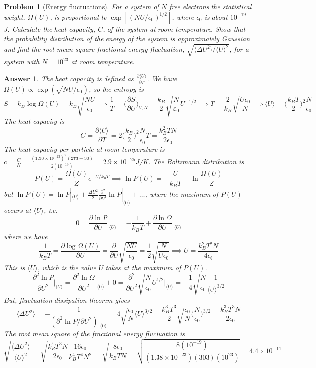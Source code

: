 \documentclass[a4paper]{article}
\theoremstyle{new2}
\newtheorem{ans}{Answer}[section]
\theoremstyle{new}
\newtheorem{qns}{Problem}[section]
\begin{document}
\begin{qns}[Energy fluctuations]
For a system of $N$ free electrons the statistical weight, $\Omega(U)$, is proportional to $\exp[(NU/\epsilon_0)^{1/2}]$, where $\epsilon_0$ is about $10^{−19}$ J. Calculate the heat capacity, $C$, of the system at room temperature. Show that the probability distribution of the energy of the system is approximately Gaussian and find the root mean square fractional energy fluctuation, $\sqrt{\langle\Delta U^2\rangle/\langle U\rangle^2}$, for a system with $N = 10^{23}$ at room temperature. 
\end{qns}
\begin{ans}
The heat capacity is defined as $\frac{\partial\langle U\rangle}{\partial T}$. We have $\Omega(U)\propto\exp(\sqrt{NU/\epsilon_0})$, so the entropy is
$$S=k_B\log\Omega(U)=k_B\sqrt{\frac{NU}{\epsilon_0}}\implies\frac{1}{T}=\bigg(\frac{\partial S}{\partial U}\bigg)_{V,N}=\frac{k_B}{2}\sqrt{\frac{N}{\varepsilon_0}}U^{-1/2}\implies T=\frac{2}{k_B}\sqrt{\frac{U\epsilon_0}{N}}\implies\langle U\rangle=\bigg(\frac{k_BT}{2}\bigg)^2\frac{N}{\epsilon_0}$$
The heat capacity is
$$C=\frac{\partial\langle U\rangle}{\partial T}=2\bigg(\frac{k_B}{2}\bigg)^2\frac{N}{\epsilon_0}T=\frac{k_B^2TN}{2\epsilon_0}$$
The heat capacity per particle at room temperature is $c=\frac{C}{N}=\frac{(1.38\times10^{-23})^2(273+30)}{2(10^{-19})}=2.9\times10^{-25}$J/K. The Boltzmann distribution is
$$P(U)=\frac{\Omega(U)}{Z}e^{-U/k_BT}\implies\ln P(U)=-\frac{U}{k_BT}+\ln\frac{\Omega(U)}{Z}$$
but $\ln P(U)=\ln P|_{\langle U\rangle}+\frac{\Delta U^2}{2}\frac{\partial^2}{\partial U^2}\ln P|_{\langle U\rangle}+\dots$, where the maximum of $P(U)$ occurs at $\langle U\rangle$, i.e. 
$$0=\frac{\partial\ln P}{\partial U}\bigg|_{\langle U\rangle}=-\frac{1}{k_BT}+\frac{\partial\ln\Omega}{\partial U}\bigg|_{\langle U\rangle}$$
where we have
$$\frac{1}{k_BT}=\frac{\partial\log\Omega(U)}{\partial U}=\frac{\partial}{\partial U}\sqrt{\frac{NU}{\epsilon_0}}=\frac{1}{2}\sqrt{\frac{N}{U\epsilon_0}}\implies U=\frac{k_B^2T^2N}{4\epsilon_0}$$
This is $\langle U\rangle$, which is the value $U$ takes at the maximum of $P(U)$.
$$\frac{\partial^2\ln P}{\partial U^2}\bigg|_{\langle U\rangle}=\frac{\partial^2\ln\Omega}{\partial U^2}\bigg|_{\langle U\rangle}+0=\frac{\partial^2}{\partial U^2}\sqrt{\frac{N}{\epsilon_0}}U^{1/2}\bigg|_{\langle U\rangle}=-\frac{1}{4}\sqrt{\frac{N}{\epsilon_0}}\frac{1}{\langle U\rangle^{3/2}}$$
But, fluctuation-dissipation theorem gives
$$\langle\Delta U^2\rangle=-\frac{1}{(\partial^2\ln P/\partial U^2)|_{\langle U\rangle}}=4\sqrt{\frac{\epsilon_0}{N}}\langle U\rangle^{3/2}=\frac{k_B^3T^3}{2}\sqrt{\frac{\epsilon_0}{N}}\bigg(\frac{N}{\epsilon_0}\bigg)^{3/2}=\frac{k_B^3T^3N}{2\epsilon_0}$$
The root mean square of the fractional energy fluctuation is
$$\sqrt{\frac{\langle\Delta U^2\rangle}{\langle U\rangle^2}}=\sqrt{\frac{k_B^3T^3N}{2\epsilon_0}\frac{16\epsilon_0}{k_B^4T^4N^2}}=\sqrt{\frac{8\epsilon_0}{k_BTN}}=\sqrt{\frac{8(10^{-19})}{(1.38\times10^{-23})(303)(10^{23})}}=4.4\times10^{-11}$$
\end{ans}
\end{document}

